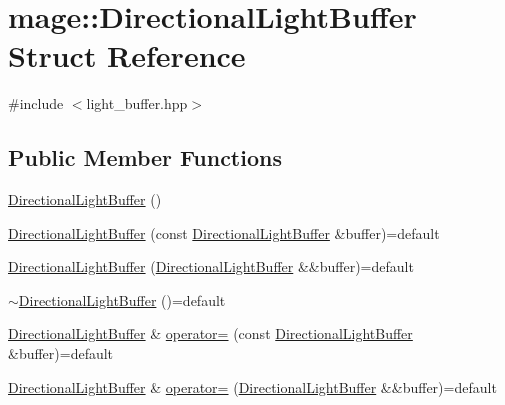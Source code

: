 \hypertarget{structmage_1_1_directional_light_buffer}{}\section{mage\+:\+:Directional\+Light\+Buffer Struct Reference}
\label{structmage_1_1_directional_light_buffer}


{\ttfamily \#include $<$light\+\_\+buffer.\+hpp$>$}

\subsection*{Public Member Functions}
\begin{DoxyCompactItemize}
\item 
\hyperlink{structmage_1_1_directional_light_buffer_a73a87ba7b016b6c62375da62b4fdf7b6}{Directional\+Light\+Buffer} ()
\item 
\hyperlink{structmage_1_1_directional_light_buffer_a2b61889818f441416421511aa1dcd294}{Directional\+Light\+Buffer} (const \hyperlink{structmage_1_1_directional_light_buffer}{Directional\+Light\+Buffer} \&buffer)=default
\item 
\hyperlink{structmage_1_1_directional_light_buffer_aed86ef6ac6e2dfd9cda2c2be844ceca5}{Directional\+Light\+Buffer} (\hyperlink{structmage_1_1_directional_light_buffer}{Directional\+Light\+Buffer} \&\&buffer)=default
\item 
\hyperlink{structmage_1_1_directional_light_buffer_a6d9c1eb4b4b15c586524e5436d9d6162}{$\sim$\+Directional\+Light\+Buffer} ()=default
\item 
\hyperlink{structmage_1_1_directional_light_buffer}{Directional\+Light\+Buffer} \& \hyperlink{structmage_1_1_directional_light_buffer_ae076cdb33035cf8c7ce14750eaf3601a}{operator=} (const \hyperlink{structmage_1_1_directional_light_buffer}{Directional\+Light\+Buffer} \&buffer)=default
\item 
\hyperlink{structmage_1_1_directional_light_buffer}{Directional\+Light\+Buffer} \& \hyperlink{structmage_1_1_directional_light_buffer_a9af62b47c7ba1b1f6833e8da79b8c054}{operator=} (\hyperlink{structmage_1_1_directional_light_buffer}{Directional\+Light\+Buffer} \&\&buffer)=default
\end{DoxyCompactItemize}
